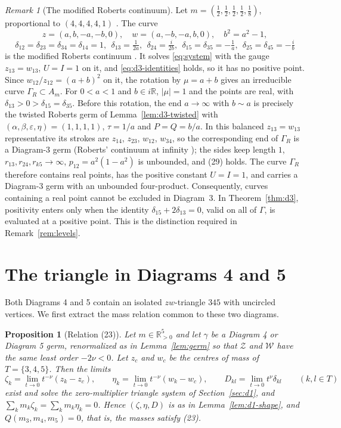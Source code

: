 \documentclass[11pt]{amsart}
\newtheorem{proposition}[theorem]{Proposition}
\theoremstyle{definition}
\theoremstyle{remark}
\newtheorem{remark}[theorem]{Remark}
\newcommand{\R}{\mathbb{R}}
\newcommand{\Rp}{\mathbb{R}_{>0}}
\begin{document}
\begin{remark}[The modified Roberts continuum]\label{rem:d3-roberts}
Let $m=(\frac12,\frac12,\frac12,\frac12,\frac18)$, proportional to $(4,4,4,4,1)$
\cite[Rem.~8, p.~583]{AK}.  The curve
\[
z=(a,b,-a,-b,0),\quad w=(a,-b,-a,b,0),\quad b^2=a^2-1,
\]
\[
\delta_{12}=\delta_{23}=\delta_{34}=\delta_{14}=1,\ \ \delta_{13}=\tfrac1{2a},\ \
\delta_{24}=\tfrac{i}{2b},\ \ \delta_{15}=\delta_{35}=-\tfrac1a,\ \ \delta_{25}=\delta_{45}=-\tfrac ib
\]
is the modified Roberts continuum \cite[p.~543]{AK}.  It solves \eqref{eq:system} with the gauge
$z_{13}=w_{13}$, $U=I=1$ on it, and \eqref{eq:d3-identities} holds, so it has no positive point.
Since $w_{12}/z_{12}=(a+b)^2$ on it, the rotation by $\mu=a+b$ gives an irreducible curve
$\Gamma_R\subset A_m$.  For $0<a<1$ and $b\in i\R$, $|\mu|=1$ and the points are real, with
$\delta_{13}>0>\delta_{15}=\delta_{35}$.
{Before this rotation, the end $a\to\infty$ with $b\sim a$ is precisely the twisted Roberts
germ of Lemma~\ref{lem:d3-twisted} with
$(\alpha,\beta,\varepsilon,\eta)=(1,1,1,1)$, $\tau=1/a$ and $P=Q=b/a$.
In this balanced $z_{13}=w_{13}$ representative its strokes are
$z_{14}$, $z_{23}$, $w_{12}$, $w_{34}$, so the corresponding end of $\Gamma_R$ is a Diagram-3 germ}
(Roberts' continuum at infinity \cite[\S7.2]{AK}); the sides keep length $1$,
$r_{13},r_{24},r_{k5}\to\infty$, $p_{12}=a^2(1-a^2)$ is unbounded, and (29) holds.
{The curve $\Gamma_R$ therefore contains real points, has the positive constant
$U=I=1$, and carries a Diagram-3 germ with an unbounded four-product.
Consequently, curves containing a real point cannot be excluded in Diagram~3.
In Theorem~\ref{thm:d3}, positivity enters only when the identity
$\delta_{15}+2\delta_{13}=0$, valid on all of $\Gamma$, is evaluated at a positive point.
This is the distinction required in Remark~\ref{rem:levels}.}
\end{remark}



\section{The triangle in Diagrams 4 and 5}\label{sec:d45}

{Both Diagrams 4 and 5 contain an isolated $zw$-triangle $345$ with uncircled vertices.
We first extract the mass relation common to these two diagrams.}

\begin{proposition}[Relation (23)]\label{prop:d45-first}
Let $m\in\Rp^5$ and let $\gamma$ be a Diagram 4 or Diagram 5 germ, renormalized as in
Lemma~\ref{lem:germ} so that $\mathcal Z$ and $\mathcal W$ have the same least order $-2\nu<0$.
Let $z_c$ and $w_c$ be the centres of mass of $T=\{3,4,5\}$.  Then the limits
\[
  \zeta_k=\lim_{t\to0}t^{-\nu}(z_k-z_c),\qquad \eta_k=\lim_{t\to0}t^{-\nu}(w_k-w_c),\qquad
  D_{kl}=\lim_{t\to0}t^{\nu}\delta_{kl}\qquad(k,l\in T)
\]
exist and solve the zero-multiplier triangle system of Section~\ref{sec:d1}, and
$\sum_km_k\zeta_k=\sum_km_k\eta_k=0$.  Hence $(\zeta,\eta,D)$ is as in
Lemma~\ref{lem:d1-shape}, and $Q(m_3,m_4,m_5)=0$, that is, the masses satisfy (23).
\end{proposition}
\end{document}
